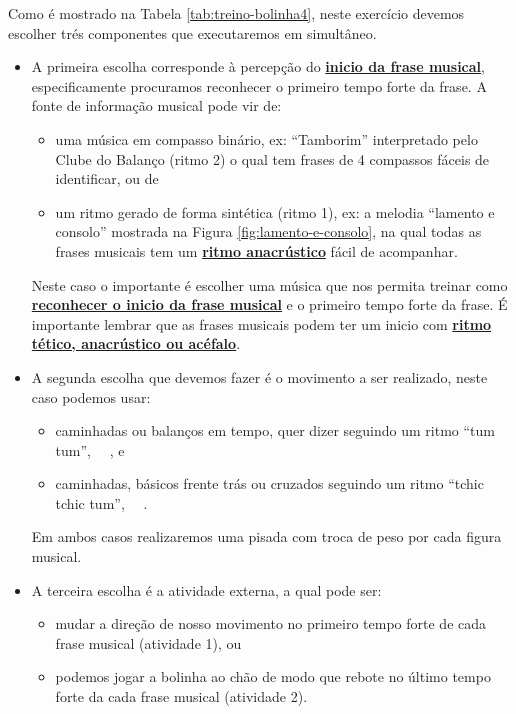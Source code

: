 \begin{example}
Como é mostrado na Tabela \ref{tab:treino-bolinha4},
neste exercício devemos escolher trés componentes que executaremos em simultâneo.
\begin{itemize}
\item A primeira escolha corresponde à percepção do \hyperref[pos:detetandoiniciofrase]{\textbf{inicio da frase musical}},
especificamente procuramos reconhecer o primeiro tempo forte da frase.
A fonte de informação musical pode vir de:
    \begin{itemize}
    \item uma música em compasso binário, ex: ``Tamborim'' interpretado pelo Clube do Balanço (ritmo 2) 
    o qual tem frases de 4 compassos fáceis de identificar, ou de
    \item um ritmo gerado de forma sintética (ritmo 1),
    ex: a melodia ``lamento e consolo'' mostrada na Figura \ref{fig:lamento-e-consolo}, 
    na qual todas as frases musicais tem um \hyperref[subsec:InicioFraseMusical]{\textbf{ritmo anacrústico}}
    fácil de acompanhar.
    \end{itemize}
Neste caso o importante é escolher uma música que nos permita treinar
como \hyperref[pos:detetandoiniciofrase]{\textbf{reconhecer o inicio da frase musical}}
e o primeiro tempo forte da frase. 
É importante lembrar que as frases musicais podem ter um inicio com 
\hyperref[subsec:InicioFraseMusical]{\textbf{ritmo tético, anacrústico ou acéfalo}}.
\item A segunda escolha que devemos fazer é o movimento a ser realizado,
neste caso podemos usar:
    \begin{itemize}
    \item caminhadas ou balanços em tempo, quer dizer seguindo um ritmo ``tum tum'', 
    \leftrepeat~\Vier\Vier~\rightrepeat, e
    \item caminhadas, básicos frente trás ou cruzados seguindo um ritmo ``tchic tchic tum'', 
    \leftrepeat~\Vier\Acht\Acht~\rightrepeat.
    \end{itemize}
Em ambos casos realizaremos uma pisada com troca de peso por cada figura musical.
\item A terceira escolha é a atividade externa, a qual pode ser: 
    \begin{itemize}
    \item mudar a direção de nosso movimento no primeiro tempo forte de cada frase musical (atividade 1), ou
    \item podemos jogar a bolinha ao chão de modo que rebote no último tempo forte da cada frase musical (atividade 2).
    \end{itemize}
\end{itemize}
\end{example}

